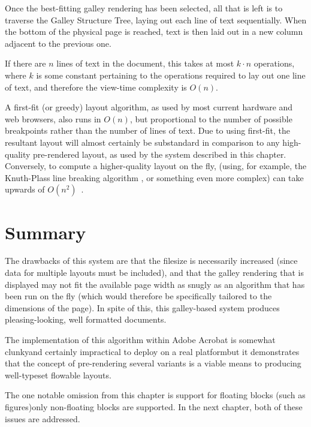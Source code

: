 Once the best-fitting galley rendering has been selected, all that is left is to traverse the Galley Structure Tree, laying out each line of text sequentially. When the bottom of the physical page is reached, text is then laid out in a new column adjacent to the previous one.

If there are $n$ lines of text in the document, this takes at most $k\cdot{}n$ operations, where $k$ is some constant pertaining to the operations required to lay out one line of text, and therefore the view-time complexity is $O(n)$.

A first-fit (or greedy) layout algorithm, as used by most current \ebook{} hardware and web browsers, also runs in $O(n)$, but proportional to the number of possible breakpoints rather than the number of lines of text. Due to using first-fit, the resultant layout will almost certainly be substandard in comparison to any high-quality pre-rendered layout, as used by the system described in this chapter. Conversely, to compute a higher-quality layout on the fly, (using, for example, the Knuth-Plass line breaking algorithm \cite{Knuth1981,Knuth1999}, or something even more complex) can take upwards of $O(n^2)$~\cite{Hirschberg1987,Eppstein1992,Hurst2009,Pinkney2013}.

\section{Summary}
The drawbacks of this system are that the filesize is necessarily increased (since data for multiple layouts must be included), and that the galley rendering that is displayed may not fit the available page width as snugly as an algorithm that has been run on the fly (which would therefore be specifically tailored to the dimensions of the page). In spite of this, this galley-based system produces pleasing-looking, well formatted documents.

The implementation of this algorithm within Adobe Acrobat is somewhat clunky\ed and certainly impractical to deploy on a real \ebook{} platform\ed but it demonstrates that the concept of pre-rendering several variants is a viable means to producing well-typeset flowable layouts.

The one notable omission from this chapter is support for floating blocks (such as figures)\ed only non-floating blocks are supported. In the next chapter, both of these issues are addressed.

